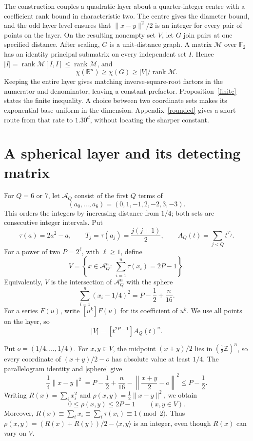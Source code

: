 \documentclass[12pt,a4paper]{article}
\newcommand{\R}{\mathbb R}
\newcommand{\F}{\mathbb F_2}
\newcommand{\Z}{\mathbb Z}
\newcommand{\rank}{\operatorname{rank}}
\begin{document}
The construction couples a quadratic layer about a quarter-integer centre with a coefficient rank bound in characteristic two. The centre gives the diameter bound, and the odd layer level ensures that $\|x-y\|^2/2$ is an integer for every pair of points on the layer. On the resulting nonempty set $V$, let $G$ join pairs at one specified distance. After scaling, $G$ is a unit-distance graph. A matrix $\mathcal M$ over $\F$ has an identity principal submatrix on every independent set $I$. Hence $|I|=\rank\mathcal M[I,I]\le\rank\mathcal M$, and
\begin{equation}\label{bridge}
\chi(\R^n)\ge\chi(G)\ge |V|/\rank\mathcal M.
\end{equation}
Keeping the entire layer gives matching inverse-square-root factors in the numerator and denominator, leaving a constant prefactor. Proposition~\ref{finite} states the finite inequality. A choice between two coordinate sets makes its exponential base uniform in the dimension. Appendix~\ref{rounded} gives a short route from that rate to $1.30^d$, without locating the sharper constant.

\section{A spherical layer and its detecting matrix}\label{geometry}
For $Q=6$ or $7$, let $\mathcal A_Q$ consist of the first $Q$ terms of
\[
(a_0,\ldots,a_6)=(0,1,-1,2,-2,3,-3).
\]
This orders the integers by increasing distance from $1/4$; both sets are consecutive integer intervals. Put
\[
\tau(a)=2a^2-a,\qquad T_j=\tau(a_j)=\frac{j(j+1)}2,
\qquad A_Q(t)=\sum_{j<Q}t^{T_j}.
\]
For a power of two $P=2^\ell$, with $\ell\ge1$, define
\begin{equation}\label{layer}
V=\left\{x\in\mathcal A_Q^n:\ \sum_{i=1}^n\tau(x_i)=2P-1\right\}.
\end{equation}
Equivalently, $V$ is the intersection of $\mathcal A_Q^n$ with the sphere
\begin{equation}\label{sphere}
\sum_{i=1}^n(x_i-1/4)^2=P-\frac12+\frac{n}{16}.
\end{equation}
For a series $F(u)$, write $[u^k]F(u)$ for its coefficient of $u^k$. We use all points on the layer, so
\begin{equation}\label{vertices}
|V|=[t^{2P-1}]A_Q(t)^n.
\end{equation}

Put $o=(1/4,\ldots,1/4)$. For $x,y\in V$, the midpoint $(x+y)/2$ lies in $(\tfrac12\Z)^n$, so every coordinate of $(x+y)/2-o$ has absolute value at least $1/4$. The parallelogram identity and \eqref{sphere} give
\begin{equation}\label{quadratic}
\frac14\|x-y\|^2
=P-\frac12+\frac n{16}-\left\|\frac{x+y}{2}-o\right\|^2
\le P-\frac12.
\end{equation}
Writing $R(x)=\sum_i x_i^2$ and $\rho(x,y)=\frac12\|x-y\|^2$, we obtain
\[
0\le\rho(x,y)\le2P-1\qquad(x,y\in V).
\]
Moreover, $R(x)\equiv\sum_i x_i\equiv\sum_i\tau(x_i)\equiv1\pmod2$.
Thus $\rho(x,y)=(R(x)+R(y))/2-\langle x,y\rangle$ is an integer, even though $R(x)$ can vary on $V$.
\end{document}
